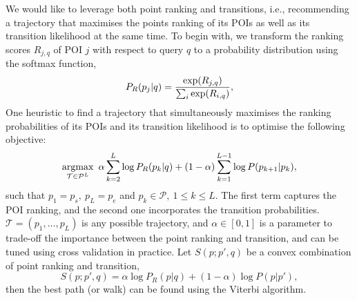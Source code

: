 We would like to leverage both point ranking and transitions,
i.e., recommending a trajectory that maximises the points ranking of its POIs as well as its transition likelihood at the same time.
To begin with, we transform the ranking scores $R_{j,q}$ of POI $j$ with respect to query $q$
to a probability distribution using the softmax function,
\eqmoveup
\begin{equation}
\eqmoveup
\label{eq:rankprob}
P_R(p_j | q) = \frac{\exp(R_{j,q})}{\sum_i \exp(R_{i,q})},
\end{equation}
One heuristic to find a trajectory that simultaneously maximises the ranking probabilities of its POIs and its transition likelihood is to optimise the following objective:
\eqmoveup
\begin{equation*}\eqmoveup
    \argmax_{\mathcal{T} \in \mathcal{P}^L} ~\alpha \sum_{k=2}^{L} \log P_R(p_{k} | q) +
                                     (1-\alpha) \sum_{k=1}^{L-1} \log P(p_{{k+1}} | p_{k}),
\end{equation*}
such that
$p_{1} = p_s, ~ p_{L} = p_e$ and
$p_{k} \in \mathcal{P}, ~1 \le k \le L$.
The first term captures the POI ranking, and the second one incorporates the transition probabilities.
$\mathcal{T} = (p_{1}, \dots, p_{L})$ is any possible trajectory,
and $\alpha \in [0, 1]$ is a parameter to trade-off the importance between the point ranking and transition,
and can be tuned using cross validation in practice.
Let $S(p; p', q)$ be a convex combination of point ranking and transition,
\eqmoveup
\begin{equation}\label{eq:combined-score}
    S(p; p', q)  = \alpha \log P_R(p|q) + (1-\alpha) \log P(p|p'),
\end{equation}
then the best path (or walk) can be found using the Viterbi algorithm.
